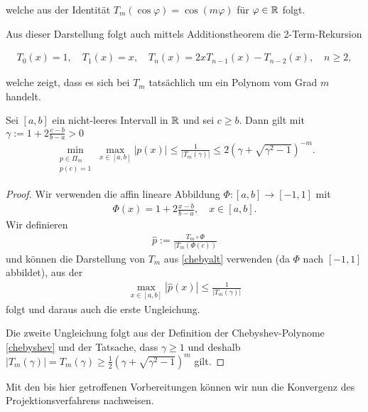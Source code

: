 \documentclass{article}
\begin{document}
welche aus der Identität $T_m(\cos \varphi) = \cos (m \varphi)$ für $\varphi \in \mathbb{R}$ folgt.

Aus dieser Darstellung folgt auch mittels Additionstheorem die 2-Term-Rekursion

\begin{align*}
	T_0(x) = 1, \quad T_1(x) = x, \quad T_{n}(x) = 2x T_{n-1}(x) - T_{n-2}(x), \quad n \geq 2,
\end{align*}

welche zeigt, dass es sich bei $T_m$ tatsächlich um ein Polynom vom Grad $m$ handelt.

\begin{lemma}
	Sei $[a,b]$ ein nicht-leeres Intervall in $\mathbb{R}$ und sei $c \geq b$. Dann gilt mit $\gamma := 1 + 2 \frac{c-b}{b-a} > 0$
	\begin{align}\label{polminmax}
		\min_{\substack{p \in \Pi_m \\
		p(c) = 1}} \max_{x \in [a,b]} |p(x)| \leq \frac{1}{|T_m(\gamma)|} \leq 2 (\gamma + \sqrt{\gamma^2 -1})^{-m}.
	\end{align}
\end{lemma}

\begin{proof}
	Wir verwenden die affin lineare Abbildung $\Phi: [a,b] \to [-1,1]$ mit
	\begin{align*}
		\Phi(x) = 1 + 2 \frac{x-b}{b-a}, \quad x \in [a,b].
	\end{align*}
	Wir definieren
	\begin{align*}
		\hat{p} := \frac{T_m \circ \Phi}{|T_m(\Phi(c))}
	\end{align*}
	und können die Darstellung von $T_m$ aus \ref{chebyalt} verwenden (da $\Phi$ nach $[-1,1]$ abbildet), aus der
	\begin{align*}
		\max_{x \in [a,b]}|\hat{p}(x)| \leq \frac{1}{|T_m(\gamma)|}
	\end{align*}
	folgt und daraus auch die erste Ungleichung.

	Die zweite Ungleichung folgt aus der Definition der Chebyshev-Polynome \ref{chebyshev} und der Tatsache, dass $\gamma \geq 1$ und deshalb $|T_m(\gamma)| = T_m(\gamma) \geq \frac{1}{2} (\gamma+ \sqrt{\gamma^2-1})^m$ gilt.
\end{proof}

Mit den bis hier getroffenen Vorbereitungen können wir nun die Konvergenz des Projektionsverfahrens nachweisen.
\end{document}
